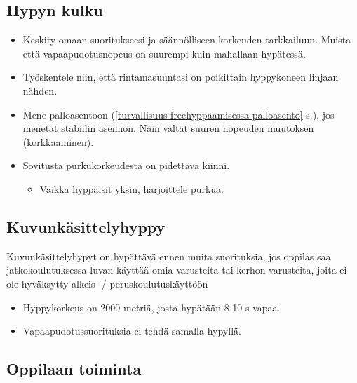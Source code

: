 \begin{multicols}{2}
\subsection{ Hypyn kulku }
\label{jatkokoulutuksen-suoritukset-hypyn-kulku}

\begin{itemize}
\item  Keskity omaan suoritukseesi ja säännölliseen korkeuden tarkkailuun. Muista että vapaapudotusnopeus on suurempi kuin mahallaan hypätessä.  
\item  Työskentele niin, että rintamasuuntasi on poikittain hyppykoneen linjaan nähden. 
\item  Mene palloasentoon (\ref{turvallisuus-freehyppaamisessa-palloasento} s.\pageref{turvallisuus-freehyppaamisessa-palloasento}), jos menetät stabiilin asennon. Näin vältät suuren nopeuden muutoksen (korkkaaminen). 
\item  Sovitusta purkukorkeudesta on pidettävä kiinni. 
	\begin{itemize}
	\item  Vaikka hyppäisit yksin, harjoittele purkua. 
	\end{itemize}
\end{itemize}

\end{multicols}\pagebreak\begin{multicols}{2} 

\section{ Kuvunkäsittelyhyppy }
\label{jatkokoulutuksen-suoritukset-kuvunkasittelyhyppy}


Kuvunkäsittelyhypyt on hypättävä ennen muita suorituksia, jos oppilas saa jatkokoulutuksessa luvan käyttää omia varusteita tai kerhon varusteita, joita ei ole hyväksytty alkeis- / peruskoulutuskäyttöön 

\begin{itemize}
\item  Hyppykorkeus on 2000 metriä, josta hypätään 8-10 s vapaa. 
\item  Vapaapudotussuorituksia ei tehdä samalla hypyllä. 
\end{itemize}
\subsection{ Oppilaan toiminta }
\label{jatkokoulutuksen-suoritukset-oppilaan-toiminta}


\end{multicols}
